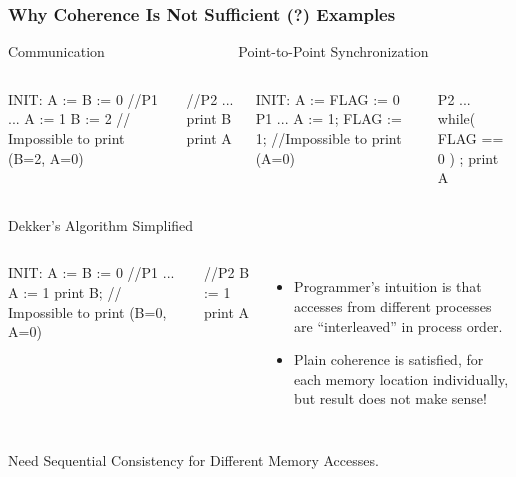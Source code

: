 \documentclass{beamer}
\newcommand{\emp}[1]{\textcolor{DikuRed}{ #1}}
\begin{document}
\begin{frame}[fragile,t]
\frametitle{Why Coherence Is Not Sufficient (?) Examples}

\begin{block}{Communication{\tt~~~~~~~~~~~~~~~~~~} Point-to-Point Synchronization}
\begin{columns}
\begin{colorcode}[fontsize=\scriptsize]
    INIT: A := B := 0
//P1
...
A := 1
B := 2
// Impossible to print (B=2, A=0)
\end{colorcode} 
\begin{colorcode}[fontsize=\scriptsize]

//P2
...
print B
print A

\end{colorcode} 
\begin{colorcode}[fontsize=\scriptsize]
    INIT: A := FLAG := 0
P1
...
A    := 1;
FLAG := 1;
//Impossible to print (A=0)
\end{colorcode} 
\begin{colorcode}[fontsize=\scriptsize]

P2
...
while( FLAG == 0 ) ;
print A

\end{colorcode} 
\end{columns}
\end{block}

\begin{block}{Dekker's Algorithm Simplified}
\begin{columns}
\vspace{-2ex}
\begin{colorcode}[fontsize=\scriptsize]
    INIT: A := B := 0
//P1
...
A := 1
print B;
// Impossible to print (B=0, A=0)
\end{colorcode} 
\vspace{-2ex}
\begin{colorcode}[fontsize=\scriptsize]

//P2
B := 1
print A

\end{colorcode} 
\vspace{-2ex}
\begin{itemize}
    \item Programmer's intuition is that accesses from different processes are 
            ``interleaved'' in process order.
    \item Plain coherence is satisfied, for each memory location individually,
            but result does not make sense!
\end{itemize}
\end{columns}
\end{block}


\emp{Need Sequential Consistency for Different Memory Accesses.}

\end{frame}
\end{document}

